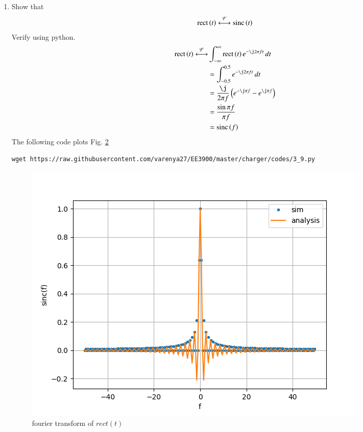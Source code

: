 \documentclass[journal,12pt,twocolumn]{IEEEtran}
\renewcommand\thesection{\arabic{section}}
\begin{document}
\begin{enumerate}[label=\thesection.\arabic*
,ref=\thesection.\theenumi]
\begin{figure}[h!]
	    \caption{fourier transform of $x(t)$ }
	    \label{fig:xt-ft}
	\end{figure}
 \item Show that 
 \begin{align}
	 \text{rect}\left(t\right) \overset{\mathcal{F}}{ \longleftrightarrow} \text{sinc}\left(t\right)
 \end{align}
 Verify using python.\\\solution
 \begin{align}
     \rect{t} \system{F}&\int_{-\infty}^\infty \rect{t}e^{-\j2\pi ft}\,dt\\
     &= \int_{-0.5}^{0.5}e^{-\j2\pi ft}\,dt\\
     &= \frac{\j}{2\pi f}\brak{e^{-\j\pi f}-e^{\j\pi f}}\\
     &= \frac{\sin{\pi f}}{\pi f}\\
     &= \sinc{f}
 \end{align}
  The following code plots Fig. \ref{fig:rect-ft}
	\begin{lstlisting}
wget https://raw.githubusercontent.com/varenya27/EE3900/master/charger/codes/3_9.py
\end{lstlisting}
	\begin{figure}[h!]
	    \centering
	    \includegraphics[width=\columnwidth]{figures/rect-ft.png}
	    \caption{fourier transform of $rect(t)$ }
	    \label{fig:rect-ft}
	\end{figure}


\end{enumerate}
\end{document}
